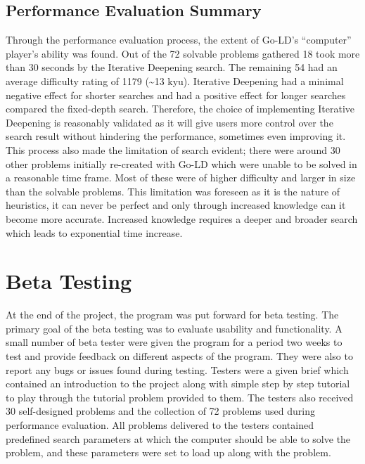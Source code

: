 \documentclass{l4proj}
\begin{document}
\subsection{Performance Evaluation Summary}

Through the performance evaluation process, the extent of Go-LD’s “computer” player’s ability was found. Out of the 72 solvable problems gathered 18 took more than 30 seconds by the Iterative Deepening search. The remaining 54 had an average difficulty rating of 1179 (\textasciitilde 13 kyu). Iterative Deepening had a minimal negative effect for shorter searches and had a positive effect for longer searches compared the fixed-depth search. Therefore, the choice of implementing Iterative Deepening is reasonably validated as it will give users more control over the search result without hindering the performance, sometimes even improving it. This process also made the limitation of search evident; there were around 30 other problems initially re-created with Go-LD which were unable to be solved in a reasonable time frame. Most of these were of higher difficulty and larger in size than the solvable problems. This limitation was foreseen as it is the nature of heuristics, it can never be perfect and only through increased knowledge can it become more accurate. Increased knowledge requires a deeper and broader search which leads to exponential time increase.



\section{Beta Testing}
At the end of the project, the program was put forward for beta testing. The primary goal of the beta testing was to evaluate usability and functionality. A small number of beta tester were given the program for a period two weeks to test and provide feedback on different aspects of the program. They were also to report any bugs or issues found during testing. Testers were a given brief which contained an introduction to the project along with simple step by step tutorial to play through the tutorial problem provided to them. The testers also received 30 self-designed problems and the collection of 72 problems used during performance evaluation. All problems delivered to the testers contained predefined search parameters at which the computer should be able to solve the problem, and these parameters were set to load up along with the problem.
\end{document}
